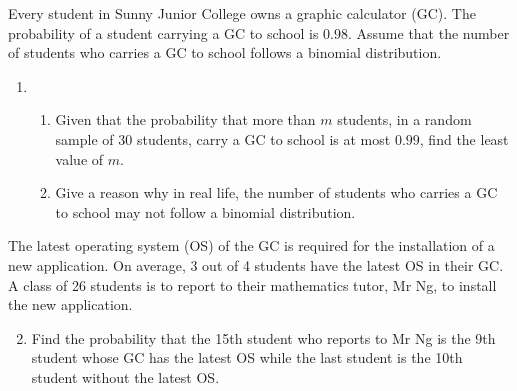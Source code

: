 \begin{problem}
    Every student in Sunny Junior College owns a graphic calculator (GC). The probability of a student carrying a GC to school is $0.98$. Assume that the number of students who carries a GC to school follows a binomial distribution.

    \begin{enumerate}
        \item \begin{enumerate}
            \item Given that the probability that more than $m$ students, in a random sample of 30 students, carry a GC to school is at most $0.99$, find the least value of $m$.
            \item Give a reason why in real life, the number of students who carries a GC to school may not follow a binomial distribution.
        \end{enumerate}
    \end{enumerate}

    The latest operating system (OS) of the GC is required for the installation of a new application. On average, 3 out of 4 students have the latest OS in their GC. A class of 26 students is to report to their mathematics tutor, Mr Ng, to install the new application.

    \begin{enumerate}
        \setcounter{enumi}{1}
        \item Find the probability that the 15th student who reports to Mr Ng is the 9th student whose GC has the latest OS while the last student is the 10th student without the latest OS.
    \end{enumerate}
\end{problem}


